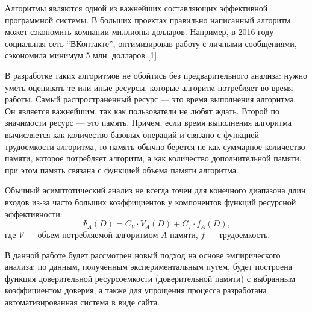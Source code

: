 
Алгоритмы являются одной из важнейших составляющих эффективной программной системы. В больших проектах правильно написанный алгоритм может сэкономить компании миллионы долларов. Например, в 2016 году социальная сеть ``ВКонтакте'', оптимизировав работу с личными сообщениями, сэкономила минимум 5 млн. долларов [1].

В разработке таких алгоритмов не обойтись без предварительного анализа: нужно уметь оценивать те или иные ресурсы, которые алгоритм потребляет во время работы. Самый распространенный ресурс --- это время выполнения алгоритма. Он является важнейшим, так как пользователи не любят ждать. Второй по значимости ресурс --- это память. Причем, если время выполнения алгоритма вычисляется как количество базовых операций и связано с функцией трудоемкости алгоритма, то память обычно берется не как суммарное количество памяти, которое потребляет алгоритм, а как количество дополнительной памяти, при этом память связана с функцией объема памяти алгоритма.

Обычный асимптотический анализ не всегда точен для конечного диапазона длин входов из-за часто больших коэффициентов у компонентов функций ресурсной эффективности:
$$\Psi_A(D) = C_V \cdot V_A(D) + C_f \cdot f_A(D),$$
где $V$ --- объем потребляемой алгоритмом $A$ памяти, $f$ --- трудоемкость.

В данной работе будет рассмотрен новый подход на основе эмпирического анализа: по данным, полученным экспериментальным путем, будет построена функция доверительной ресурсоемкости (доверительной памяти) с выбранным коэффициентом доверия, а также для упрощения процесса разработана автоматизированная система в виде сайта.

\pagebreak